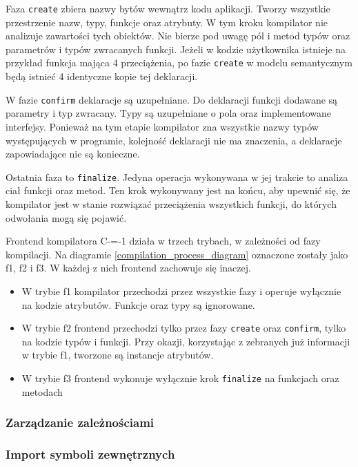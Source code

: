 Faza \lstinline{create} zbiera nazwy bytów wewnątrz kodu aplikacji.
Tworzy wszystkie przestrzenie nazw, typy, funkcje oraz atrybuty.
W tym kroku kompilator nie analizuje zawartości tych obiektów.
Nie bierze pod uwagę pól i metod typów oraz parametrów i typów zwracanych funkcji.
Jeżeli w kodzie użytkownika istnieje na przykład funkcja mająca 4 przeciążenia, po fazie \lstinline{create} w modelu semantycznym będą istnieć 4 identyczne kopie tej deklaracji.

W fazie \lstinline{confirm} deklaracje są uzupełniane.
Do deklaracji funkcji dodawane są parametry i typ zwracany.
Typy są uzupełniane o pola oraz implementowane interfejsy.
Ponieważ na tym etapie kompilator zna wszystkie nazwy typów występujących w programie, kolejność deklaracji nie ma znaczenia, a deklaracje zapowiadające nie są konieczne.

Ostatnia faza to \lstinline{finalize}.
Jedyna operacja wykonywana w jej trakcie to analiza ciał funkcji oraz metod.
Ten krok wykonywany jest na końcu, aby upewnić się, że kompilator jest w stanie rozwiązać przeciążenia wszystkich funkcji, do których odwołania mogą się pojawić.

Frontend kompilatora C-=-1 działa w trzech trybach, w zależności od fazy kompilacji.
Na diagramie \ref{compilation_process_diagram} oznaczone zostały jako f1, f2 i f3.
W każdej z nich frontend zachowuje się inaczej.
\begin{itemize}
    \item W trybie f1 kompilator przechodzi przez wszystkie fazy i operuje wyłącznie na kodzie atrybutów.
    Funkcje oraz typy są ignorowane.
    \item W trybie f2 frontend przechodzi tylko przez fazy \lstinline{create} oraz \lstinline{confirm}, tylko na kodzie typów i funkcji.
    Przy okazji, korzystając z zebranych już informacji w trybie f1, tworzone są instancje atrybutów.
    \item W trybie f3 frontend wykonuje wyłącznie krok \lstinline{finalize} na funkcjach oraz metodach
\end{itemize}


\subsubsection{Zarządzanie zależnościami}

\subsubsection{Import symboli zewnętrznych}

